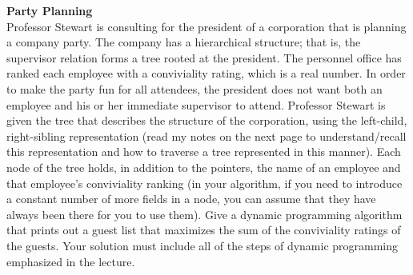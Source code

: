 \textbf{Party Planning} \\
Professor Stewart is consulting for the president of a corporation that is planning a company party.
The company has a hierarchical structure; that is, the supervisor relation forms a tree rooted at the
president. The personnel office has ranked each employee with a conviviality rating, which is a real
number. In order to make the party fun for all attendees, the president does not want both an employee
and his or her immediate supervisor to attend. Professor Stewart is given the tree that describes the
structure of the corporation, using the left-child, right-sibling representation (read my notes on the next
page to understand/recall this representation and how to traverse a tree represented in this manner).
Each node of the tree holds, in addition to the pointers, the name of an employee and that employee’s
conviviality ranking (in your algorithm, if you need to introduce a constant number of more fields
in a node, you can assume that they have always been there for you to use them). Give a dynamic
programming algorithm that prints out a guest list that maximizes the sum of the conviviality ratings
of the guests.
Your solution must include all of the steps of dynamic programming emphasized in the lecture.

